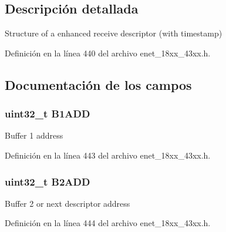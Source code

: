 \subsection{Descripción detallada}
Structure of a enhanced receive descriptor (with timestamp) 

Definición en la línea 440 del archivo enet\+\_\+18xx\+\_\+43xx.\+h.



\subsection{Documentación de los campos}
\subsubsection[{\texorpdfstring{B1\+A\+DD}{B1ADD}}]{ uint32\+\_\+t B1\+A\+DD}\hypertarget{struct_e_n_e_t___e_n_h_r_x_d_e_s_c___t_a9b99a80d13d854bce5c3f9646964c34e}{}\label{struct_e_n_e_t___e_n_h_r_x_d_e_s_c___t_a9b99a80d13d854bce5c3f9646964c34e}
Buffer 1 address 

Definición en la línea 443 del archivo enet\+\_\+18xx\+\_\+43xx.\+h.

\subsubsection[{\texorpdfstring{B2\+A\+DD}{B2ADD}}]{ uint32\+\_\+t B2\+A\+DD}\hypertarget{struct_e_n_e_t___e_n_h_r_x_d_e_s_c___t_a3cf5d995cea5c3b42b9224871c5b18a1}{}\label{struct_e_n_e_t___e_n_h_r_x_d_e_s_c___t_a3cf5d995cea5c3b42b9224871c5b18a1}
Buffer 2 or next descriptor address 

Definición en la línea 444 del archivo enet\+\_\+18xx\+\_\+43xx.\+h.

